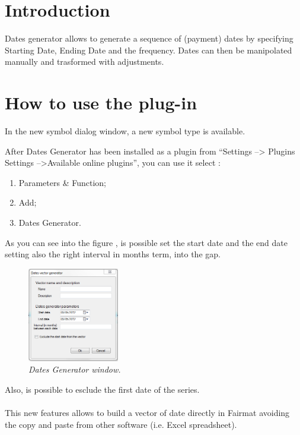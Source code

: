\newcommand{\pluginName}{Dates Generator}
\newcommand{\pluginVersion}{1.0}




\section{Introduction}
Dates generator allows to generate a sequence of (payment) dates by specifying Starting Date, Ending Date and the frequency.  Dates can then be manipolated manually and trasformed with adjustments.
\section{How to use the plug-in}
In the new symbol dialog window, a new symbol type is available.

After Dates Generator has been installed as a plugin from ``Settings --> Plugins Settings 
-->Available online plugins'', you can use it select : 
\begin{enumerate}
\item Parameters \& Function;
\item Add;
\item Dates Generator.
\end{enumerate}
As you can see into the figure \label{fig:DG}, is possible set the start date and the end date setting also the right interval in months term, into the gap. 
\begin{figure}[h!]
\includegraphics[width=4cm]{DG_img}
\centering
\caption{\small{\emph{Dates Generator window.}}}
\label{fig:DG}
\end{figure}
Also, is possible to esclude the first date of the series.\\
\\
This new features allows to build a vector of date directly in Fairmat avoiding the 
copy and paste from other software (i.e. Excel spreadsheet).




